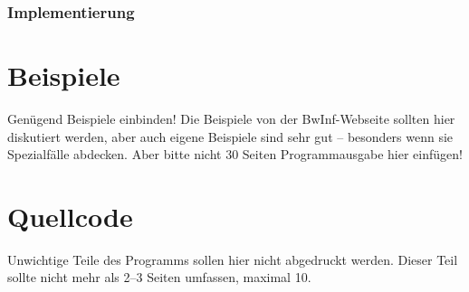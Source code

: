 \documentclass[a4paper,10pt,ngerman]{scrartcl}
\begin{document}
\subsubsection{Implementierung}
\section{Beispiele}
Genügend Beispiele einbinden! Die Beispiele von der BwInf-Webseite sollten hier diskutiert werden, aber auch eigene Beispiele sind sehr gut – besonders wenn sie Spezialfälle abdecken. Aber bitte nicht 30 Seiten Programmausgabe hier einfügen!

\section{Quellcode}
Unwichtige Teile des Programms sollen hier nicht abgedruckt werden. Dieser Teil sollte nicht mehr als 2–3 Seiten umfassen, maximal 10.
\end{document}
